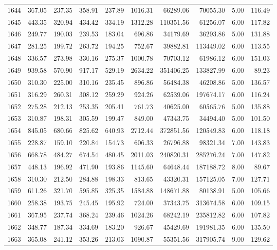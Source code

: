 \begin{tabular}{lrrrrrrrrr}
1644 & 367.05 & 237.35 & 358.91 & 237.89 & 1016.31 & 66289.06 & 70055.30 & 5.00 & 116.49 \\
1645 & 443.35 & 320.94 & 434.42 & 334.19 & 1312.28 & 110351.56 & 61256.07 & 6.00 & 117.82 \\
1646 & 249.77 & 190.03 & 239.53 & 183.04 & 696.86 & 34179.69 & 36293.86 & 5.00 & 131.88 \\
1647 & 281.25 & 199.72 & 263.72 & 194.25 & 752.67 & 39882.81 & 113449.02 & 6.00 & 113.55 \\
1648 & 336.57 & 273.98 & 330.16 & 275.37 & 1000.78 & 70703.12 & 61986.12 & 6.00 & 151.03 \\
1649 & 939.58 & 570.90 & 917.17 & 529.19 & 2634.22 & 351406.25 & 133827.99 & 6.00 & 89.23 \\
1650 & 310.30 & 225.00 & 310.16 & 235.45 & 896.86 & 56484.38 & 46208.86 & 5.00 & 136.57 \\
1651 & 316.29 & 260.31 & 308.12 & 259.29 & 924.26 & 62539.06 & 197674.17 & 6.00 & 116.24 \\
1652 & 275.28 & 212.13 & 253.35 & 205.41 & 761.73 & 40625.00 & 60565.76 & 5.00 & 135.88 \\
1653 & 310.87 & 198.31 & 305.59 & 199.47 & 849.00 & 47343.75 & 34494.40 & 5.00 & 101.50 \\
1654 & 845.05 & 680.66 & 825.62 & 640.93 & 2712.44 & 372851.56 & 120549.83 & 6.00 & 118.18 \\
1655 & 228.87 & 159.10 & 220.84 & 154.73 & 606.33 & 26796.88 & 98321.34 & 7.00 & 143.83 \\
1656 & 668.78 & 484.27 & 674.54 & 480.45 & 2011.03 & 240820.31 & 285276.24 & 7.00 & 147.82 \\
1657 & 448.13 & 196.92 & 471.90 & 193.86 & 1145.60 & 64648.44 & 187188.72 & 8.00 & 89.67 \\
1658 & 310.30 & 212.50 & 284.88 & 198.33 & 813.65 & 43320.31 & 157125.05 & 7.00 & 127.71 \\
1659 & 611.26 & 321.70 & 595.85 & 325.35 & 1584.88 & 148671.88 & 80138.91 & 5.00 & 105.66 \\
1660 & 258.38 & 193.75 & 245.45 & 195.92 & 724.00 & 37343.75 & 313674.58 & 6.00 & 109.15 \\
1661 & 367.95 & 237.74 & 368.24 & 239.46 & 1024.26 & 68242.19 & 235812.82 & 6.00 & 107.82 \\
1662 & 348.77 & 187.34 & 334.69 & 183.20 & 926.67 & 45429.69 & 191981.35 & 6.00 & 135.50 \\
1663 & 365.08 & 241.12 & 353.26 & 213.03 & 1090.87 & 55351.56 & 317905.74 & 9.00 & 129.62 \\

\end{tabular}
